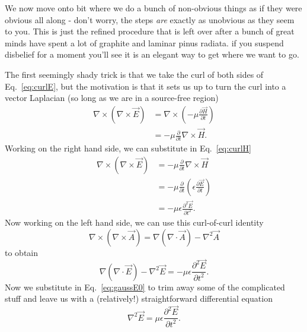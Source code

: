 \documentclass{tufte-handout}
\begin{document}
We now move onto bit where we do a bunch of non-obvious things as if they were obvious all along - don't worry, the steps \emph{are} exactly as unobvious as they seem to you. This is just the refined procedure that is left over after a bunch of great minds have spent a lot of graphite and laminar pinus radiata. if you suspend disbelief for a moment you'll see it is an elegant way to get where we want to go.

The first seemingly shady trick is that we take the curl of both sides of Eq.~\ref{eq:curlE}, but the motivation is that it sets us up to turn the curl into a vector Laplacian (so long as we are in a source-free region)
\begin{align}
\nabla\times\left(\nabla\times\vec{E}\right) & = \nabla\times\left(-\mu\frac{\partial \vec{H}}{\partial t} \right) \\
 & = -\mu \frac{\partial}{\partial t}\nabla\times{}\vec{H}.\label{eq:curlcurlE} 
\end{align}
Working on the right hand side, we can substitute in Eq.~\ref{eq:curlH}\marginnote{\[ \nabla\times\vec{H} = \epsilon\frac{\partial\vec{E}}{\partial t}\]}
\begin{align}
\nabla\times\left(\nabla\times\vec{E}\right) &= -\mu \frac{\partial}{\partial t}\nabla\times{}\vec{H} \\
&= -\mu \frac{\partial}{\partial t}\left(\epsilon\frac{\partial\vec{E}}{\partial t}\right) \\
&= -\mu\epsilon \frac{\partial^2\vec{E}}{\partial t^2}.
\end{align}
Now working on the left hand side, we can use this curl-of-curl identity
\begin{equation}
\nabla\times\left(\nabla\times\vec{A}\right)=\nabla\left(\nabla\cdot\vec{A}\right) - \nabla^{2}\vec{A} \label{eq:curlofcurl}
\end{equation}
to obtain
\begin{equation}
\nabla\left(\nabla\cdot\vec{E}\right) - \nabla^{2}\vec{E}= -\mu\epsilon \frac{\partial^2\vec{E}}{\partial t^2}.
\end{equation}
Now we substitute in Eq.~\ref{eq:gaussE0}\marginnote{\[\nabla\cdot\vec{E} = 0\]} to trim away some of the complicated stuff and leave us with a (relatively!) straightforward differential equation \marginnote{\[\nabla{}0=0\]}
\begin{equation}
 \nabla^{2}\vec{E}= \mu\epsilon \frac{\partial^2\vec{E}}{\partial t^2}.\label{eq:Ediff}
\end{equation}
\end{document}
